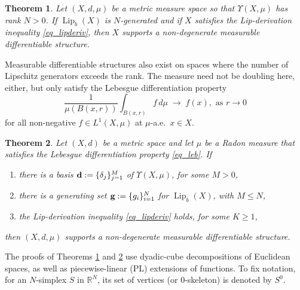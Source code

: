 \documentclass[reqno]{amsart}
\theoremstyle{plain}
\newtheorem{thm}{Theorem}[section]
\theoremstyle{definition}
\theoremstyle{remark}
\numberwithin{equation}{section}
\renewcommand{\d}{\delta}
\newcommand{\Lip}{\operatorname{Lip}}
\newcommand{\R}{\mathbb{R}}
\newcommand{\U}{\Upsilon}
\begin{document}
\begin{thm} \label{thm_dimmatch}
Let $(X,d,\mu)$ be a metric measure space 
so that $\U(X,\mu)$ has rank $N > 0$.
If $\Lip_b(X)$ is $N$-generated and if $X$ satisfies the Lip-derivation inequality \eqref{eq_lipderiv}, then $X$ supports a non-degenerate measurable differentiable structure.
\end{thm}

Measurable differentiable structures also exist on spaces where the number of Lipschitz generators exceeds the rank.  The measure need not be doubling here, either, but only satisfy the Lebesgue differentiation property
\begin{equation} \label{eq_leb}
\frac{1}{\mu(B(x,r))} \int_{B(x,r)} f \,d\mu \;\longrightarrow\; f(x), \text{ as } r \to 0
\end{equation}
for all non-negative $f \in L^1(X,\mu)$ at $\mu$-a.e.\ $x \in X$.

\begin{thm} \label{thm_fingen-measdiff}
Let $(X,d)$ be a metric space and let $\mu$ be a Radon measure that satisfies the Lebesgue differentiation property \eqref{eq_leb}.  If
\begin{enumerate}
\item there is a basis ${\bf d} := \{\d_j\}_{j=1}^M$ of $\U(X,\mu)$, for some $M > 0$,
\item there is a generating set ${\bf g} := \{g_i\}_{i=1}^N$ for $\Lip_b(X)$, with $M \leq N$,
\item the Lip-derivation inequality \eqref{eq_lipderiv} holds, for some $K \geq 1$,
\end{enumerate}
then $(X,d,\mu)$ supports a non-degenerate measurable differentiable structure.
\end{thm}

The proofs of Theorems \ref{thm_dimmatch} and \ref{thm_fingen-measdiff} use dyadic-cube decompositions of Euclidean spaces, as well as piecewise-linear (PL) extensions of functions.  %
To fix notation, for an $N$-simplex $S$ in $\R^N$, its set of vertices (or $0$-skeleton) is denoted by $S^0$.
\end{document}
